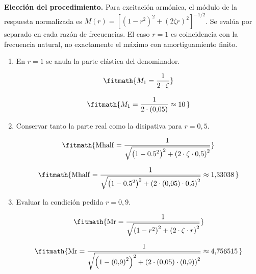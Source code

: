 \noindent\textbf{Elección del procedimiento.} Para excitación armónica, el módulo de la respuesta normalizada es $M(r)=[(1-r^2)^2+(2\zeta r)^2]^{-1/2}$. Se evalúa por separado en cada razón de frecuencias. El caso $r=1$ es coincidencia con la frecuencia natural, no exactamente el máximo con amortiguamiento finito.

\begin{enumerate}

\item En $r=1$ se anula la parte elástica del denominador.

\[\fitmath{M_{1}=\frac{1}{2\cdot \zeta}}\]

\[\fitmath{M_{1}=\frac{1}{2\cdot (0{,}05)}\approx 10\,}\]

\item Conservar tanto la parte real como la disipativa para $r=0{,}5$.

\[\fitmath{\mathrm{Mhalf}=\frac{1}{\sqrt{{\left(1-{0.5}^{2}\right)}^{2}+{\left(2\cdot \zeta\cdot 0{,}5\right)}^{2}}}}\]

\[\fitmath{\mathrm{Mhalf}=\frac{1}{\sqrt{{\left(1-{0.5}^{2}\right)}^{2}+{\left(2\cdot (0{,}05)\cdot 0{,}5\right)}^{2}}}\approx 1{,}33038\,}\]

\item Evaluar la condición pedida $r=0{,}9$.

\[\fitmath{\mathrm{Mr}=\frac{1}{\sqrt{{\left(1-{r}^{2}\right)}^{2}+{\left(2\cdot \zeta\cdot r\right)}^{2}}}}\]

\[\fitmath{\mathrm{Mr}=\frac{1}{\sqrt{{\left(1-{(0{,}9)}^{2}\right)}^{2}+{\left(2\cdot (0{,}05)\cdot (0{,}9)\right)}^{2}}}\approx 4{,}756515\,}\]

\end{enumerate}
